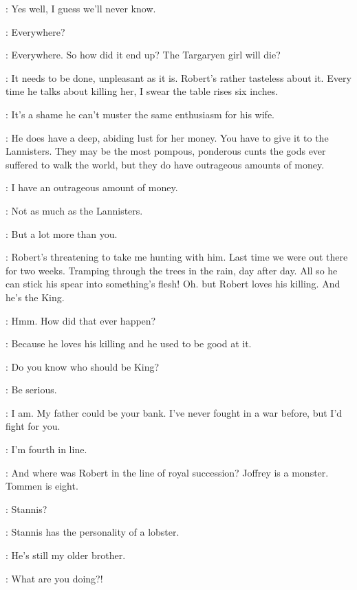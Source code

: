 \LORAS: Yes well, I guess we'll never know. 


\RENLY: Everywhere? 

\LORAS: Everywhere. So how did it end up? The Targaryen girl will die? 

\RENLY: It needs to be done, unpleasant as it is. Robert's rather tasteless about it. Every time he talks about killing her, I swear the table rises six inches. 

\LORAS: It's a shame he can't muster the same enthusiasm for his wife. 

\RENLY: He does have a deep, abiding lust for her money. You have to give it to the Lannisters. They may be the most pompous, ponderous cunts the gods ever suffered to walk the world, but they do have outrageous amounts of money. 

\LORAS: I have an outrageous amount of money. 

\RENLY: Not as much as the Lannisters. 

\LORAS: But a lot more than you. 
\enlargethispage*{20pt}

\RENLY: Robert's threatening to take me hunting with him. Last time we were out there for two weeks.  Tramping through the trees in the rain, day after day. All so he can stick his spear into something's flesh! Oh. but Robert loves his killing. And he's the King. 

\LORAS: Hmm.  How did that ever happen? 

\RENLY: Because he loves his killing and he used to be good at it. 

\LORAS: Do you know who should be King? 

\RENLY: Be serious. 

\LORAS: I am. My father could be your bank. I've never fought in a war before, but I'd fight for you. 

\RENLY: I'm fourth in line. 

\LORAS: And where was Robert in the line of royal succession? Joffrey is a monster. Tommen is eight. 

\RENLY: Stannis? 

\LORAS: Stannis has the personality of a lobster. 

\RENLY: He's still my older brother. 


\RENLY: What are you doing?! 

